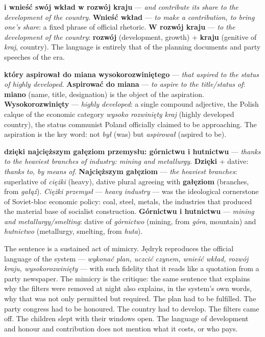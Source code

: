 \textbf{i wnieść swój wkład w rozwój kraju} ---
\textit{and contribute its share to the development
of the country}. \textbf{Wnieść wkład} ---
\textit{to make a contribution, to bring one's
share}: a fixed phrase of official rhetoric.
\textbf{W rozwój kraju} --- \textit{to the
development of the country}: \textbf{rozwój}
(development, growth) + \textbf{kraju} (genitive
of \textit{kraj}, country). The language is
entirely that of the planning documents and party
speeches of the era.

\textbf{który aspirował do miana wysokorozwiniętego}
--- \textit{that aspired to the status of highly
developed}. \textbf{Aspirować do miana} ---
\textit{to aspire to the title/status of}:
\textbf{miano} (name, title, designation) is the
object of the aspiration. \textbf{Wysokorozwinięty}
--- \textit{highly developed}: a single compound
adjective, the Polish calque of the economic
category \textit{wysoko rozwinięty kraj}
(highly developed country), the status communist
Poland officially claimed to be approaching.
The aspiration is the key word: not \textit{był}
(was) but \textit{aspirował} (aspired to be).

\textbf{dzięki najcięższym gałęziom przemysłu:
górnictwu i hutnictwu} --- \textit{thanks to the
heaviest branches of industry: mining and
metallurgy}. \textbf{Dzięki} + dative: \textit{thanks
to, by means of}. \textbf{Najcięższym gałęziom}
--- \textit{the heaviest branches}: superlative
of \textit{ciężki} (heavy), dative plural agreeing
with \textbf{gałęziom} (branches, from
\textit{gałąź}). \textit{Ciężki przemysł} ---
\textit{heavy industry} --- was the ideological
cornerstone of Soviet-bloc economic policy: coal,
steel, metals, the industries that produced the
material base of socialist construction.
\textbf{Górnictwu i hutnictwu} --- \textit{mining
and metallurgy/smelting}: dative of \textit{górnictwo}
(mining, from \textit{góra}, mountain) and
\textit{hutnictwo} (metallurgy, smelting, from
\textit{huta}).

\medskip
The sentence is a sustained act of mimicry. Jędryk
reproduces the official language of the system ---
\textit{wykonać plan, uczcić czynem, wnieść wkład,
rozwój kraju, wysokorozwinięty} --- with such
fidelity that it reads like a quotation from a
party newspaper. The mimicry is the critique: the
same sentence that explains why the filters were
removed at night also explains, in the system's
own words, why that was not only permitted but
required. The plan had to be fulfilled. The party
congress had to be honoured. The country had to
develop. The filters came off. The children slept
with their windows open. The language of
development and honour and contribution does not
mention what it costs, or who pays.

